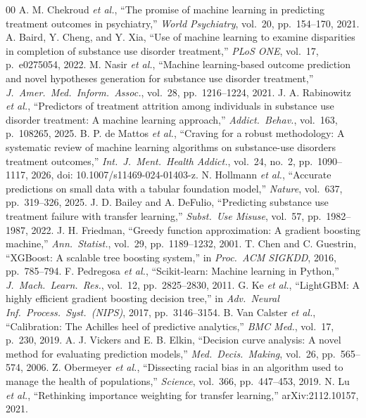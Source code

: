 \documentclass[conference]{IEEEtran}
\begin{document}
\begin{thebibliography}{00}
 A. M. Chekroud \textit{et al.}, ``The promise of machine learning in predicting treatment outcomes in psychiatry,'' \textit{World Psychiatry}, vol.~20, pp.~154--170, 2021.
 A. Baird, Y. Cheng, and Y. Xia, ``Use of machine learning to examine disparities in completion of substance use disorder treatment,'' \textit{PLoS ONE}, vol.~17, p.~e0275054, 2022.
 M. Nasir \textit{et al.}, ``Machine learning-based outcome prediction and novel hypotheses generation for substance use disorder treatment,'' \textit{J.\ Amer.\ Med.\ Inform.\ Assoc.}, vol.~28, pp.~1216--1224, 2021.
 J. A. Rabinowitz \textit{et al.}, ``Predictors of treatment attrition among individuals in substance use disorder treatment: A machine learning approach,'' \textit{Addict.\ Behav.}, vol.~163, p.~108265, 2025.
 B. P. de Mattos \textit{et al.}, ``Craving for a robust methodology: A systematic review of machine learning algorithms on substance-use disorders treatment outcomes,'' \textit{Int.\ J.\ Ment.\ Health Addict.}, vol.~24, no.~2, pp.~1090--1117, 2026, doi: 10.1007/s11469-024-01403-z.
 N. Hollmann \textit{et al.}, ``Accurate predictions on small data with a tabular foundation model,'' \textit{Nature}, vol.~637, pp.~319--326, 2025.
 J. D. Bailey and A. DeFulio, ``Predicting substance use treatment failure with transfer learning,'' \textit{Subst.\ Use Misuse}, vol.~57, pp.~1982--1987, 2022.
 J. H. Friedman, ``Greedy function approximation: A gradient boosting machine,'' \textit{Ann.\ Statist.}, vol.~29, pp.~1189--1232, 2001.
 T. Chen and C. Guestrin, ``XGBoost: A scalable tree boosting system,'' in \textit{Proc.\ ACM SIGKDD}, 2016, pp.~785--794.
 F. Pedregosa \textit{et al.}, ``Scikit-learn: Machine learning in Python,'' \textit{J.\ Mach.\ Learn.\ Res.}, vol.~12, pp.~2825--2830, 2011.
 G. Ke \textit{et al.}, ``LightGBM: A highly efficient gradient boosting decision tree,'' in \textit{Adv.\ Neural Inf.\ Process.\ Syst.\ (NIPS)}, 2017, pp.~3146--3154.
 B. Van Calster \textit{et al.}, ``Calibration: The Achilles heel of predictive analytics,'' \textit{BMC Med.}, vol.~17, p.~230, 2019.
 A. J. Vickers and E. B. Elkin, ``Decision curve analysis: A novel method for evaluating prediction models,'' \textit{Med.\ Decis.\ Making}, vol.~26, pp.~565--574, 2006.
 Z. Obermeyer \textit{et al.}, ``Dissecting racial bias in an algorithm used to manage the health of populations,'' \textit{Science}, vol.~366, pp.~447--453, 2019.
 N. Lu \textit{et al.}, ``Rethinking importance weighting for transfer learning,'' arXiv:2112.10157, 2021.
\end{thebibliography}
\end{document}
